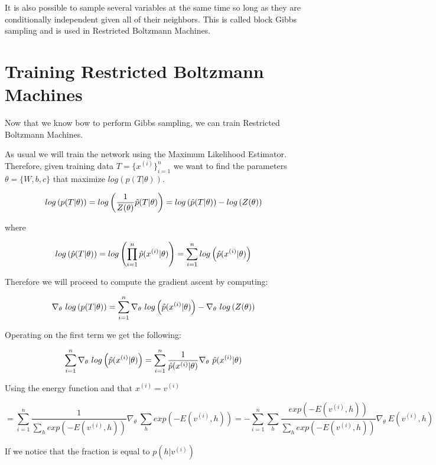 It is also possible to sample several variables at the same time so long as they are conditionally independent given all of their neighbors. This is called block Gibbs sampling and is used in Restricted Boltzmann Machines.

\newpage

\section{Training Restricted Boltzmann Machines}

Now that we know bow to perform Gibbs sampling, we can train Restricted Boltzmann Machines. 

\noindent As usual we will train the network using the Maximum Likelihood Estimator. Therefore, given training data $T=\{ x^{(i)} \}_{i=1}^n$ we want to find the parameters $\theta = \{ W, b, c \}$ that maximize $ log \left( p(T | \theta) \right)$.

$$ log \left(p(T | \theta)\right) = log \left( \frac{1}{Z(\theta)} \Hat{p} (T | \theta)  \right) = log \left( \Hat{p} (T | \theta)  \right) - log \left( Z(\theta) \right)$$

\noindent where

$$ log \left( \Hat{p} (T | \theta)  \right) = log \left( \prod_{i=1}^n    \Hat{p} (x^{(i)} | \theta)  \right) = \sum_{i=1}^n log \left(    \Hat{p} (x^{(i)} | \theta)  \right) $$

\noindent Therefore we will proceed to compute the gradient ascent by computing:

$$ \nabla_{\theta}~ log \left(p(T | \theta)\right) = \sum_{i=1}^n \nabla_{\theta}~ log \left( \Hat{p} (x^{(i)} | \theta)  \right) - \nabla_{\theta}~  log \left( Z(\theta) \right)  $$

\noindent Operating on the first term we get the following:

$$ \sum_{i=1}^n \nabla_{\theta}~ log \left( \Hat{p} (x^{(i)} | \theta)  \right) = \sum_{i=1}^n \frac{1}{\Hat{p} (x^{(i)} | \theta)} \nabla_{\theta}~ \Hat{p} (x^{(i)} | \theta)   $$

\noindent Using the energy function and that $x^{(i)} = v^{(i)}$

$$ = \sum_{i=1}^n \frac{1}{\sum_h exp \left( -E (v^{(i)}, h) \right)} \nabla_{\theta}~ \sum_h exp \left( -E (v^{(i)}, h) \right) = - \sum_{i=1}^n \sum_h \frac{exp \left( -E (v^{(i)}, h) \right)}{\sum_h exp \left( -E (v^{(i)}, h) \right)} \nabla_{\theta}~  E (v^{(i)}, h)  $$

\noindent If we notice that the fraction is equal to $p(h | v^{(i)})$

